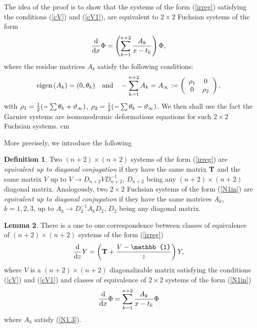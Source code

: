 \documentclass[12pt]{article}
\def\thi{{\vartheta_\infty}}
\newcommand{\ID}{\mathbb{1}}
\theoremstyle{definition}
\newtheorem{df}{Definition}
\theoremstyle{theorem}
\newtheorem{lm}[df]{Lemma}
\begin{document}
The idea of the proof is to show that the systems of the form (\ref{irreg})
satisfying the conditions (\ref{cV}) and (\ref{cV1}),
 are equivalent to $2\times 2$ Fuchsian systems of the form
\begin{equation}
{{\rm d}\over{\rm d}x} \Phi=\left(
\sum_{k=1}^{n+2}{{A}_k\over x-t_k} \right)\Phi,
\label{N1in}
\end{equation}
where the residue matrices ${A}_k$ satisfy the following 
conditions:
\begin{equation}
{\rm eigen}\left({A}_k\right)=(0,{\theta_k})
\quad\hbox{and}\quad
-\sum_{k=1}^{n+2}{A}_k={A}_\infty:=\left(
\begin{array}{cc}
\rho_1 & 0\\ 0 & \rho_2\\
\end{array}\right),
\label{N1.3}\end{equation}
with $\rho_1={1\over 2}(-\sum\theta_k+\thi)$, 
$\rho_2={1\over 2}(-\sum\theta_k-\thi)$.
We then shall use the fact the Garnier systems are isomonodromic deformations
equations for such $2\times 2$ Fuchsian systems.
 cm

More precisely, we introduce the following

\begin{df} Two $(n+2)\times(n+2)$ systems of the form (\ref{irreg}) are 
{\it equivalent up to diagonal conjugation}\/ if they have the 
same matrix ${\bf T}$ and the same matrix $V$ up to
$V\to D_{n+2} V D_{n+2}^{-1}$, $D_{n+2}$ being any $(n+2)\times(n+2)$
diagonal matrix. 
Analogously, two $2\times2$ Fuchsian systems of the form (\ref{N1in}) 
are {\it equivalent up to diagonal conjugation}\/ if they have the 
same matrices ${A}_k$, $k=1,2,3$, up to
${A}_k\to D_2^{-1} {A}_k D_2$, $D_2$ being any diagonal matrix.
\label{dfequi}\end{df}

\begin{lm} 
There is a one to one correspondence between classes of equivalence of 
$(n+2)\times(n+2)$ systems of the form (\ref{irreg})
$$
{{\rm d}\over{\rm d}z}Y
=\left({\bf T}+{V-\ID\over z}\right) Y,
$$
where $V$ is a $(n+2)\times(n+2)$ diagonalizable matrix satisfying the 
conditions (\ref{cV}) and (\ref{cV1})
and classes of equivalence of $2\times2$ systems of the form (\ref{N1in})
$$
{{\rm d}\over{\rm d} x} \Phi
=\sum_{k=1}^{n+2} {{A}_k\over x-t_k}\Phi 
$$
where ${A}_k$ satisfy (\ref{N1.3}).
\label{lmequiv}\end{lm}
\end{document}
